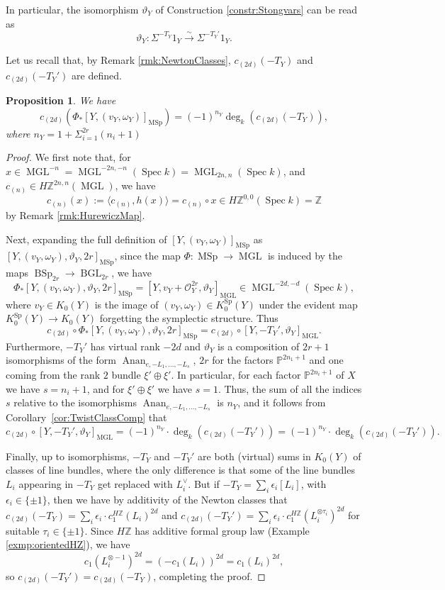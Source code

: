 \documentclass[10pt]{amsart}
\theoremstyle{definition}
\theoremstyle{plain}
\newtheorem{prop}[defn]{Proposition}
\numberwithin{equation}{section}
\newcommand{\0}{\emptyset}
\newcommand{\sO}{{\mathcal O}}
\renewcommand{\P}{{\mathbb P}}
\newcommand{\Z}{{\mathbb Z}}
\newcommand{\MGL}{{\operatorname{MGL}}}
\newcommand{\MSp}{{\operatorname{MSp}}}
\newcommand{\BGL}{{\operatorname{BGL}}}
\newcommand{\BSp}{{\operatorname{BSp}}}
\newcommand{\Sp}{{\operatorname{Sp}}}
\newcommand{\Spec}{{\operatorname{Spec}}}
\renewcommand{\deg}{{\operatorname{deg}}}
\newcommand{\Anan}{{\operatorname{Anan}}}
\begin{document}
 In particular, the isomorphism $\vartheta_Y$ of Construction \ref{constr:Stongvars} can be read as $$\vartheta_Y:\Sigma^{-T_Y}1_Y \xrightarrow{\sim}\Sigma^{-T_Y'}1_Y.$$

 Let us recall that, by Remark \ref{rmk:NewtonClasses}, $c_{(2d)}(-T_Y)$ and $c_{(2d)}(-T_Y')$ are defined.

\begin{prop}
    We have
    $$c_{(2d)}(\Phi_* [Y,(v_Y,\omega_Y)]_\MSp)=(-1)^{n_Y}\deg_k(c_{(2d)}(-T_Y)),$$
    where $n_Y=1 + \Sigma_{i=1}^{2r}(n_i+1)$
\end{prop}

\begin{proof} We first note that, for $x \in \MGL^{-n}=\MGL^{-2n,-n}(\Spec k)=\MGL_{2n,n}(\Spec k)$, and $c_{(n)} \in H\Z^{2n,n}(\MGL)$, we have
\[
c_{(n)}(x) := \langle c_{(n)},h(x) \rangle =c_{(n)}\circ x\in H\Z^{0,0}(\Spec k)=\Z
\]
by Remark \ref{rmk:HurewiczMap}.

Next, expanding the full definition of $[Y,(v_Y,\omega_Y)]_\MSp$ as $[Y,(v_Y,\omega_Y),\vartheta_Y, 2r]_\MSp$, since the map $\Phi:\MSp\to \MGL$ is induced by the maps $\BSp_{2r}\to \BGL_{2r}$, we have
\[
\Phi_* [Y,(v_Y,\omega_Y),\vartheta_Y, 2r]_\MSp =[Y, v_Y+\sO_Y^{2r},\vartheta_Y]_\MGL\in 
\MGL^{-2d,-d}(\Spec k),
\]
where $v_Y\in K_0(Y)$ is the image of $(v_Y,\omega_Y)\in K_0^\Sp(Y)$ under the evident map 
$K_0^\Sp(Y)\to K_0(Y)$ forgetting the symplectic structure. Thus
\[
c_{(2d)}\circ \Phi_* [Y,(v_Y,\omega_Y),\vartheta_Y, 2r]_\MSp=c_{(2d)}\circ [Y, -T_Y',\vartheta_Y]_\MGL.
\]
Furthermore, $-T_Y'$ has virtual rank $-2d$ and $\vartheta_Y$ is a composition of $2r+1$ isomorphisms of the form $\Anan_{e,-L_1,\ldots, -L_s}$, $2r$ for the factors $\P^{2n_1+1}$ and one coming from the rank $2$ bundle $\xi'\oplus \xi'$. In particular, for each factor $\P^{2n_i+1}$ of $X$ we have $s=n_i+1$, and for $\xi'\oplus \xi'$ we have $s=1$. Thus, the sum of all the indices $s$ relative to the isomorphisms $\Anan_{e,-L_1,\ldots, -L_s}$ is $n_Y$, and it follows from Corollary~\ref{cor:TwistClassComp} that 
\[
c_{(2d)}\circ [Y, -T_Y',\vartheta_Y]_\MGL=(-1)^{n_Y}\cdot\deg_k (c_{(2d)}(-T_Y'))
=(-1)^{n_Y}\cdot\deg_k (c_{(2d)}(-T_Y')).
\]

Finally, up to isomorphisms, $-T_Y$ and $-T_Y'$ are both (virtual) sums in $K_0(Y)$ of classes of line bundles, where the only difference is that some of the line bundles $L_i$ appearing in $-T_Y$ get replaced with $L_i^\vee$. But if $-T_Y=\sum_i\epsilon_i[L_i]$, with $\epsilon_i\in\{\pm1\}$, then we have by additivity of the Newton classes that  $c_{(2d)}(-T_Y)=\sum_i\epsilon_i\cdot c_1^{H\Z}(L_i)^{2d}$ and $c_{(2d)}(-T_Y')=\sum_i\epsilon_i\cdot c_1^{H\Z}(L_i^{\otimes \tau_i})^{2d}$ for suitable $\tau_i\in\{\pm1\}$.
Since $H\Z$ has additive formal group law (Example \ref{exmp:orientedHZ}), we have 
\[
c_1(L_i^{\otimes -1})^{2d} =(-c_1(L_i))^{2d}=c_1(L_i)^{2d},
\]
so $c_{(2d)}(-T_Y')=c_{(2d)}(-T_Y)$, completing the proof. 
\end{proof}
\end{document}
